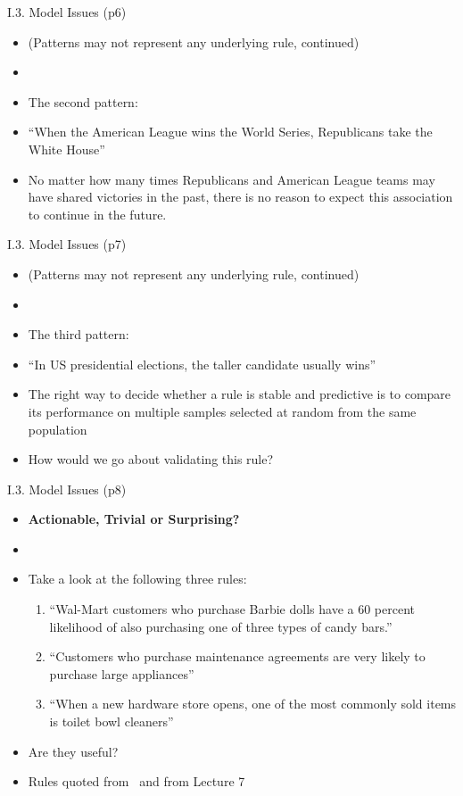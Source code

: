 \documentclass[handout]{beamer}
\newcommand{\strong}[1]{\textbf{\color{teal} #1}}
\begin{document}
\begin{frame}{I.3. Model Issues (p6)}
\begin{itemize}
\item[] (Patterns may not represent any underlying rule, continued)
\item[]
\item The second pattern:
\item[] ``When the American League wins the World Series, Republicans take the White House''
\item No matter how many times Republicans and American League teams may have shared victories in the past, there is no reason to expect this association to continue in the future.
\end{itemize}
\end{frame}
\begin{frame}{I.3. Model Issues (p7)}
\begin{itemize}
\item[] (Patterns may not represent any underlying rule, continued)
\item[]
\item The third pattern:
\item[] ``In US presidential elections, the taller candidate usually wins''
\item The right way to decide whether a rule is stable and predictive is to compare its performance on multiple samples selected at random from the same population
\item How would we go about validating this rule?
\end{itemize}
\end{frame}
\begin{frame}{I.3. Model Issues (p8)}
\begin{itemize}
\item[] \strong{Actionable, Trivial or Surprising?}
\item[]
\item Take a look at the following three rules:
    \begin{enumerate}
    \item ``Wal-Mart customers who purchase Barbie dolls have a 60 percent likelihood of also purchasing one of three types of candy bars.''\cite{palmeri:1997}
    \item ``Customers who purchase maintenance agreements are very likely to purchase large appliances''
    \item ``When a new hardware store opens, one of the most commonly sold items is toilet bowl cleaners''
    \end{enumerate}
\item Are they useful?
\item[] Rules quoted from~\cite[ch 15]{LB3:2011} and from Lecture 7
\end{itemize}
\end{frame}
\end{document}
